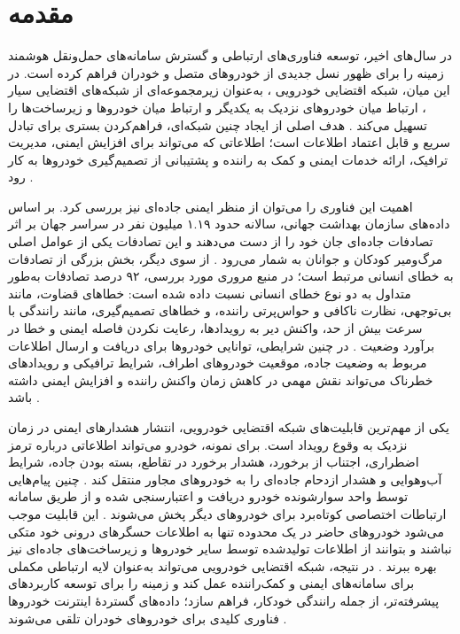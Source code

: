 \section{مقدمه}

در سال‌های اخیر، توسعه فناوری‌های ارتباطی و گسترش سامانه‌های حمل‌ونقل هوشمند  زمینه را برای ظهور نسل جدیدی از خودروهای متصل و خودران فراهم کرده است. در این میان، شبکه اقتضایی خودرویی ، به‌عنوان زیرمجموعه‌ای از شبکه‌های اقتضایی سیار ، ارتباط میان خودروهای نزدیک به یکدیگر و ارتباط میان خودروها و زیرساخت‌ها را تسهیل می‌کند \cite{hozouriOverviewVANETVehicular2023}. هدف اصلی از ایجاد چنین شبکه‌ای، فراهم‌کردن بستری برای تبادل سریع و قابل اعتماد اطلاعات است؛ اطلاعاتی که می‌تواند برای افزایش ایمنی، مدیریت ترافیک، ارائه خدمات ایمنی و کمک به راننده و پشتیبانی از تصمیم‌گیری خودروها به کار رود \cite{hozouriOverviewVANETVehicular2023,luConnectedVehiclesSolutions2014}.

اهمیت این فناوری را می‌توان از منظر ایمنی جاده‌ای نیز بررسی کرد. بر اساس داده‌های سازمان بهداشت جهانی، سالانه حدود ۱.۱۹ میلیون نفر در سراسر جهان بر اثر تصادفات جاده‌ای جان خود را از دست می‌دهند و این تصادفات یکی از عوامل اصلی مرگ‌ومیر کودکان و جوانان به شمار می‌رود \cite{farsimadanReviewSecurityChallenges2025,VanetSecurityPrivacy}. از سوی دیگر، بخش بزرگی از تصادفات به خطای انسانی مرتبط است؛ در منبع مروری مورد بررسی، ۹۲ درصد تصادفات به‌طور متداول به دو نوع خطای انسانی نسبت داده شده است: خطاهای قضاوت، مانند بی‌توجهی، نظارت ناکافی و حواس‌پرتی راننده، و خطاهای تصمیم‌گیری، مانند رانندگی با سرعت بیش از حد، واکنش دیر به رویدادها، رعایت نکردن فاصله ایمنی و خطا در برآورد وضعیت \cite{hozouriOverviewVANETVehicular2023}. در چنین شرایطی، توانایی خودروها برای دریافت و ارسال اطلاعات مربوط به وضعیت جاده، موقعیت خودروهای اطراف، شرایط ترافیکی و رویدادهای خطرناک می‌تواند نقش مهمی در کاهش زمان واکنش راننده و افزایش ایمنی داشته باشد \cite{farsimadanReviewSecurityChallenges2025}.

یکی از مهم‌ترین قابلیت‌های شبکه اقتضایی خودرویی، انتشار هشدارهای ایمنی در زمان نزدیک به وقوع رویداد است. برای نمونه، خودرو می‌تواند اطلاعاتی درباره ترمز اضطراری، اجتناب از برخورد، هشدار برخورد در تقاطع، بسته بودن جاده، شرایط آب‌وهوایی و هشدار ازدحام جاده‌ای را به خودروهای مجاور منتقل کند \cite{hozouriOverviewVANETVehicular2023}. چنین پیام‌هایی توسط واحد سوارشونده  خودرو دریافت و اعتبارسنجی شده و از طریق سامانه ارتباطات اختصاصی کوتاه‌برد  برای خودروهای دیگر پخش می‌شوند \cite{hozouriOverviewVANETVehicular2023}. این قابلیت موجب می‌شود خودروهای حاضر در یک محدوده تنها به اطلاعات حسگرهای درونی خود متکی نباشند و بتوانند از اطلاعات تولیدشده توسط سایر خودروها و زیرساخت‌های جاده‌ای نیز بهره ببرند \cite{xuInternetVehiclesBig2018}. در نتیجه، شبکه اقتضایی خودرویی می‌تواند به‌عنوان لایه ارتباطی مکملی برای سامانه‌های ایمنی و کمک‌راننده عمل کند و زمینه را برای توسعه کاربردهای پیشرفته‌تر، از جمله رانندگی خودکار، فراهم سازد؛ داده‌های گستردهٔ اینترنت خودروها  فناوری کلیدی برای خودروهای خودران تلقی می‌شوند \cite{xuInternetVehiclesBig2018}.

